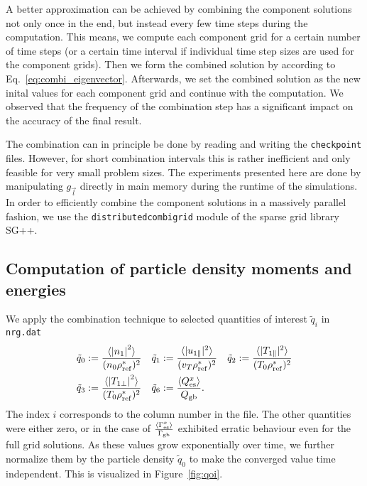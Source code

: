 \documentclass{scrartcl}
\newcommand{\abs}[1]{\left| #1 \right|}   %
\newcommand{\avg}[1]{\langle #1 \rangle}  %
\newcommand{\rf}{{\rm ref}}
\begin{document}
A better approximation can be achieved by combining the component solutions not only once in the end, but instead every few time steps during the computation. This means, we compute each component grid for a certain number of time steps (or a certain time interval if individual time step sizes are used for the component grids). Then we form the combined solution by according to Eq.~\eqref{eq:combi_eigenvector}. Afterwards, we set the combined solution as the new inital values for each component grid and continue with the computation. We observed that the frequency of the combination step has a significant impact on the accuracy of the final result. 

The combination can in principle be done by reading and writing the \texttt{checkpoint} files. However, for short combination intervals this is rather inefficient and only feasible for very small problem sizes. The experiments presented here are done by manipulating $g_{\vec l}$ directly in main memory during the runtime of the simulations. In order to efficiently combine the component solutions in a massively parallel fashion, we use the \texttt{distributedcombigrid} module of the sparse grid library SG++. 

\subsection{Computation of particle density moments and energies}
\label{sec:method_nrg}

We apply the combination technique to selected quantities of interest $\tilde{q}_i$ in \texttt{nrg.dat}
\begin{align*}
	\tilde{q}_0 & := \frac{\avg{\abs{n_1}^2}}{(n_0\rho_{\rf}^*)^2} &
	\tilde{q}_1 & := \frac{\avg{|u_{1\parallel}|^2}}{(v_T \rho_\rf^*)^2} &
	\tilde{q}_2 & := \frac{{\avg{|T_{1\parallel}|^2}}}{(T_0 \rho_\rf^*)^2} \\
	\tilde{q}_3 & := \frac{{\avg{\abs{T_{1\perp}}^2}}}{(T_0 \rho_\rf^*)^2} &
	\tilde{q}_6 & := \frac{\avg{Q_{\rm es}^x}}{Q_{\rm gb}}.
\end{align*}
The index $i$ corresponds to the column number in the file. 
The other quantities were either zero, or in the case of $\frac{\avg{\Gamma_{\rm es}^x}}{\Gamma_{\rm gb}}$ exhibited erratic behaviour even for the full grid solutions.
As these values grow exponentially over time, we further normalize them by the particle density $\tilde{q}_0$ to make the converged value time independent.
This is visualized in Figure~\ref{fig:qoi}.
\end{document}
